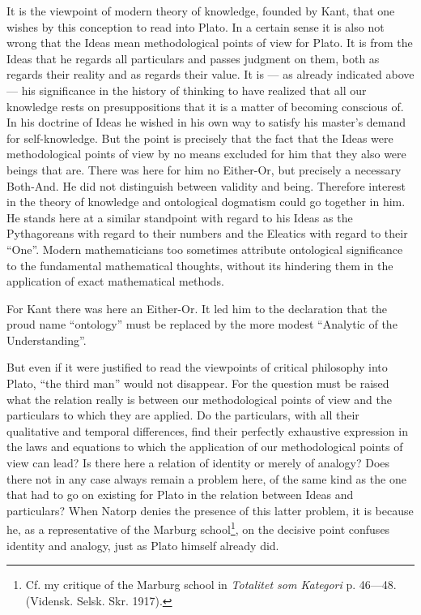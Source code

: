 \documentclass[12pt,a4paper,openany]{book}
\newcommand{\opage}[1]{\marginnote{\footnotesize\textit{[#1]}}}
\begin{document}
It is the viewpoint of modern theory of knowledge, founded by Kant,
that one wishes by this conception to read into
Plato. In a certain sense it is also not wrong
that the Ideas mean methodological points of view for Plato.
It is from the Ideas that he regards all particulars and passes
judgment on them, both as regards their reality and as regards their
value. It is --- as already indicated above ---
his significance in the history of thinking to have realized that
all our knowledge rests on presuppositions that it is a matter
of becoming conscious of. In his doctrine of Ideas he wished in his own
way to satisfy his master’s demand for self-knowledge.
But the point is precisely that the fact that the Ideas were methodological
points of view by no means excluded for him that they also
were beings that are. There was here for him no Either-Or,
but precisely a necessary Both-And. He did not distinguish
between validity and being. Therefore interest in the theory of knowledge and ontological dogmatism
could go together in him. He stands here at a similar standpoint with regard to his
Ideas as the Pythagoreans with regard to their numbers and the Eleatics
with regard to their ``One''. Modern mathematicians too
sometimes attribute ontological significance to the fundamental mathematical thoughts,
without its hindering them in the application of exact
mathematical methods.

For Kant there was here an Either-Or. It led him to
\setcounter{footnote}{0}%
\opage{22}the declaration that the proud name ``ontology'' must be replaced
by the more modest ``Analytic of the Understanding''.

But even if it were justified to read the viewpoints of critical
philosophy into Plato, ``the third
man'' would not disappear. For the question must be raised
what the relation really is between our methodological
points of view and the particulars to which they are applied. Do
the particulars, with all their qualitative and temporal differences,
find their perfectly exhaustive expression in the
laws and equations to which the application of our methodological
points of view can lead? Is there here a relation of
identity or merely of analogy? Does there not in any case
always remain a problem here, of the same kind as the one that
had to go on existing for Plato in the relation between
Ideas and particulars? When Natorp denies the presence of this latter problem,
it is because he, as a representative of
the Marburg school\footnote[1]{Cf. my critique of the Marburg school in \textit{Totalitet som Kategori} p. 46---48. (Vidensk. Selsk. Skr. 1917).}, on the decisive point confuses
identity and analogy, just as Plato himself already
did.
\end{document}
